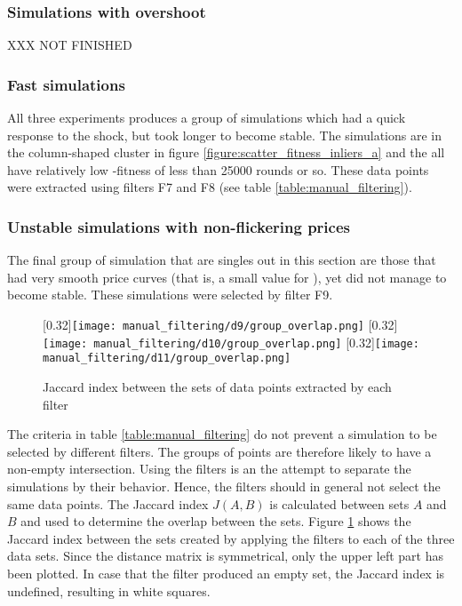 \subsubsection*{Simulations with overshoot}
XXX NOT FINISHED

\subsubsection{Fast simulations}
All three experiments produces a group of simulations which had a quick response to the shock, but took longer to become stable. The simulations are in the column-shaped cluster in figure \ref{figure:scatter_fitness_inliers_a} and the all have relatively low \timetoreachnewfundamental-fitness of less than 25000 rounds or so. These data points were extracted using filters F7 and F8 (see table \ref{table:manual_filtering}).

\subsubsection*{Unstable simulations with non-flickering prices}
The final group of simulation that are singles out in this section are those that had very smooth price curves (that is, a small value for \stdev), yet did not manage to become stable. These simulations were selected by filter F9.

\begin{figure}
\centering
{}[0.32\linewidth]{\texttt{[image: manual\_filtering/d9/group\_overlap.png]}\label{figure:jaccard_index_a}}
[0.32\linewidth]{\texttt{[image: manual\_filtering/d10/group\_overlap.png]}\label{figure:jaccard_index_b}}
[0.32\linewidth]{\texttt{[image: manual\_filtering/d11/group\_overlap.png]}\label{figure:jaccard_index_c}}
\caption{Jaccard index between the sets of data points extracted by each filter}
\label{figure:jaccard_index}
\end{figure}

The criteria in table \ref{table:manual_filtering} do not prevent a simulation to be selected by different filters. The groups of points are therefore likely to have a non-empty intersection. Using the filters is an the attempt to separate the simulations by their behavior. Hence, the filters should in general not select the same data points. The Jaccard index $J(A,B)$ is calculated between sets $A$ and $B$ and used to determine the overlap between the sets. Figure \ref{figure:jaccard_index} shows the Jaccard index between the sets created by applying the filters to each of the three data sets. Since the distance matrix is symmetrical, only the upper left part has been plotted. In case that the filter produced an empty set, the Jaccard index is undefined, resulting in white squares.

